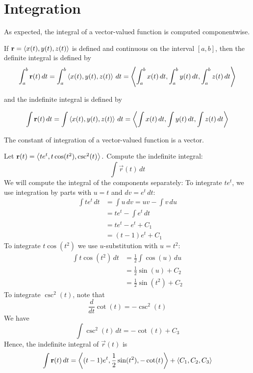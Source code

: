 \documentclass[handout]{ximera}
\begin{document}
\section{Integration}

As expected, the integral of a vector-valued function is computed componentwise.

\begin{definition}
If $\mathbf r = \left\langle x(t), y(t), z(t)\right\rangle$ is defined and continuous on the interval $[a, b]$, then the definite integral is defined by
\[
\int_a^b \mathbf r(t) \, dt = \int_a^b \left\langle x(t), y(t), z(t)\right\rangle \, dt =  \left\langle \int_a^b x(t) \, dt,\int_a^b  y(t) \, dt,\int_a^b  z(t) \, dt\right\rangle
\]

and the indefinite integral is defined by

\[
\int \mathbf r(t) \, dt = \int\left\langle x(t), y(t), z(t)\right\rangle \, dt =  \left\langle \int x(t) \, dt,\int  y(t) \, dt,\int  z(t) \, dt\right\rangle
\]
\end{definition}

\begin{remark}
The constant of integration of a vector-valued function is a vector.
\end{remark}

\begin{example}[Example 5]
Let $\mathbf r(t) = \left\langle te^t,t\cos(t^2),\csc^2(t)\right\rangle.$ Compute the indefinite integral:
\[
\int \vec r(t) \, dt
\]
We will compute the integral of the components separately:
To integrate $te^t$, we use integration by parts with $u = t$ and $dv = e^t \, dt$:
\begin{align*}
\int te^t \, dt &= \int u \, dv = uv - \int v \, du\\
                 &= te^t - \int e^t \, dt\\
                 & = te^t - e^t + C_1\\
                 & = (t-1)e^t + C_1
\end{align*}
To integrate $t\cos(t^2)$ we use $u$-substitution with $ u = t^2$:
\begin{align*}
\int t\cos(t^2) \, dt &= \frac12 \int \cos(u) \, du \\
                 &= \frac12 \sin(u) + C_2\\
                 & = \frac12 \sin(t^2) + C_2
\end{align*}
To integrate $\csc^2(t)$, note that
\[
\frac{d}{dt} \cot(t) = -\csc^2(t)
\]
We have
\[
\int \csc^2(t) \, dt = -\cot(t) + C_3
\]
Hence, the indefinite integral of $\vec r(t)$ is
\[
\int \mathbf r(t) \, dt = \left\langle (t-1)e^t,\frac12 \sin(t^2),-\cot(t)\right\rangle + \left\langle C_1, C_2, C_3\right\rangle
\]

\end{example}
\end{document}
